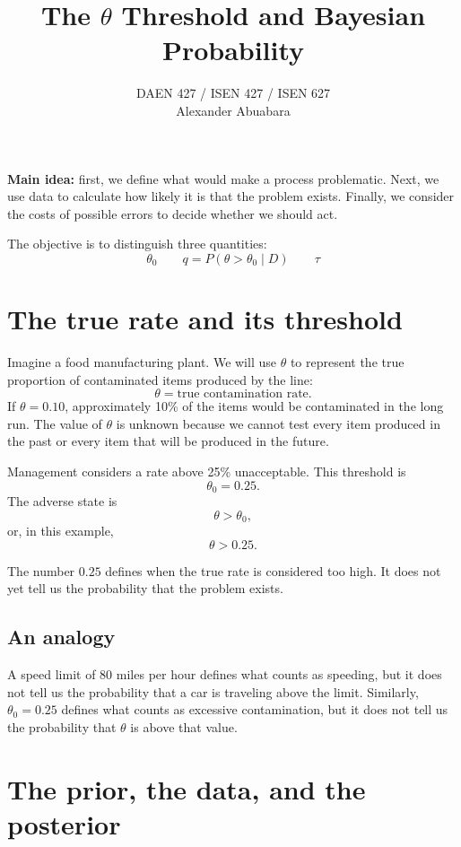 \documentclass[11pt,letter]{article}
\title{\textcolor{aggiemaroon}{The $\theta$ Threshold and Bayesian Probability}}
\author{DAEN 427 / ISEN 427 / ISEN 627\\
        Alexander Abuabara}
\date{\color{aggiemaroon}{Fall 2026}}
\begin{document}
\maketitle

\begin{ideia}
\textbf{Main idea:} first, we define what would make a process problematic.
Next, we use data to calculate how likely it is that the problem exists.
Finally, we consider the costs of possible errors to decide whether we should
act.
\end{ideia}

The objective is to distinguish three quantities:
\[
\boxed{\theta_0\qquad q=P(\theta>\theta_0\mid D)\qquad \tau}
\]

\section{The true rate and its threshold}

Imagine a food manufacturing plant. We will use $\theta$ to represent the true
proportion of contaminated items produced by the line:
\[
\theta=\text{true contamination rate}.
\]
If $\theta=0.10$, approximately 10\% of the items would be contaminated in the
long run. The value of $\theta$ is unknown because we cannot test every item
produced in the past or every item that will be produced in the future.

Management considers a rate above 25\% unacceptable. This threshold is
\[
\theta_0=0.25.
\]
The adverse state is
\[
\theta>\theta_0,
\]
or, in this example,
\[
\theta>0.25.
\]

\begin{ideia}
The number $0.25$ defines when the true rate is considered too high. It does not
yet tell us the probability that the problem exists.
\end{ideia}

\subsection{An analogy}

A speed limit of 80 miles per hour defines what counts as speeding, but it does
not tell us the probability that a car is traveling above the limit. Similarly,
$\theta_0=0.25$ defines what counts as excessive contamination, but it does not
tell us the probability that $\theta$ is above that value.

\section{The prior, the data, and the posterior}
\end{document}
